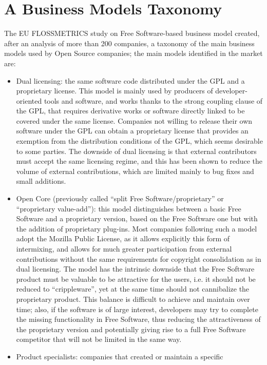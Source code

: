 \section*{A Business Models Taxonomy}

The EU FLOSSMETRICS study on Free Software-based business model created, after
an analysis of more than 200 companies, a taxonomy of the main business models
used by Open Source companies; the main models identified in the market are: 
\begin{itemize}
 \item Dual licensing: the same software code distributed under the GPL and a
proprietary license. This model is mainly used by producers of
developer-oriented tools and software, and works thanks to the strong coupling
clause of the GPL, that requires derivative works or software directly linked to
be covered under the same license. Companies not willing to release their own
software under the GPL can obtain a proprietary license that provides an
exemption from the distribution conditions of the GPL, which seems desirable to
some parties. The downside of dual licensing is that external contributors must
accept the same licensing regime, and this has been shown to reduce the volume
of external contributions, which are limited mainly to bug fixes and small
additions.
 \item Open Core (previously called ``split Free Software/proprietary'' or
``proprietary value-add''): this model distinguishes between a basic Free Software and a proprietary version, based on the Free Software one but with the addition of proprietary plug-ins. Most companies following such a model adopt the Mozilla Public License, as it allows explicitly this form of intermixing, and allows for much greater participation from external contributions without the same requirements for copyright consolidation as in dual licensing. The model has the intrinsic downside that the Free Software product must be valuable to be attractive for the users, i.e. it should not be reduced to ``crippleware'', yet at the same time should not cannibalize the proprietary product. This balance is difficult to achieve and maintain over time; also, if the software is of large interest, developers may try to complete the missing functionality in Free Software, thus reducing the attractiveness of the proprietary version and potentially giving rise to a full Free Software competitor that will not be limited in the same way.
 \item Product specialists: companies that created or maintain a specific

\end{itemize}
